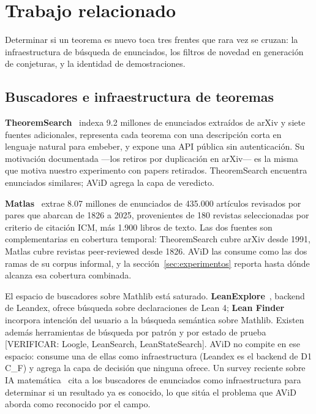 \documentclass[12pt,a4paper]{article}
\theoremstyle{remark}
\begin{document}
\section{Trabajo relacionado}
\label{sec:related}

Determinar si un teorema es nuevo toca tres frentes que rara vez se cruzan: la infraestructura de búsqueda de enunciados, los filtros de novedad en generación de conjeturas, y la identidad de demostraciones.

\subsection{Buscadores e infraestructura de teoremas}

\textbf{TheoremSearch}~\cite{theoremsearch2026} indexa 9.2 millones de enunciados extraídos de arXiv y siete fuentes adicionales, representa cada teorema con una descripción corta en lenguaje natural para embeber, y expone una API pública sin autenticación. Su motivación documentada —los retiros por duplicación en arXiv— es la misma que motiva nuestro experimento con papers retirados. TheoremSearch encuentra enunciados similares; AViD agrega la capa de veredicto.

\textbf{Matlas}~\cite{matlas2026} extrae 8.07 millones de enunciados de 435.000 artículos revisados por pares que abarcan de 1826 a 2025, provenientes de 180 revistas seleccionadas por criterio de citación ICM, más 1.900 libros de texto. Las dos fuentes son complementarias en cobertura temporal: TheoremSearch cubre arXiv desde 1991, Matlas cubre revistas peer-reviewed desde 1826. AViD las consume como las dos ramas de su corpus informal, y la sección~\ref{sec:experimentos} reporta hasta dónde alcanza esa cobertura combinada.

El espacio de buscadores sobre Mathlib está saturado. \textbf{LeanExplore}~\cite{leanexplore2025}, backend de Leandex, ofrece búsqueda sobre declaraciones de Lean 4; \textbf{Lean Finder}~\cite{leanfinder2025} incorpora intención del usuario a la búsqueda semántica sobre Mathlib. Existen además herramientas de búsqueda por patrón y por estado de prueba [VERIFICAR: Loogle, LeanSearch, LeanStateSearch]. AViD no compite en ese espacio: consume una de ellas como infraestructura (Leandex es el backend de D1 C\_F) y agrega la capa de decisión que ninguna ofrece. Un survey reciente sobre IA matemática~\cite{survey2026} cita a los buscadores de enunciados como infraestructura para determinar si un resultado ya es conocido, lo que sitúa el problema que AViD aborda como reconocido por el campo.
\end{document}
